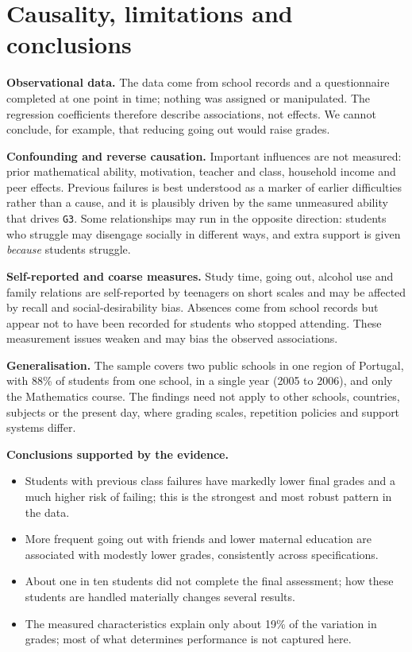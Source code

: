 \documentclass[11pt,a4paper]{article}
\begin{document}
\section{Causality, limitations and conclusions}

\textbf{Observational data.} The data come from school records and a questionnaire completed at one point in time; nothing was assigned or manipulated. The regression coefficients therefore describe associations, not effects. We cannot conclude, for example, that reducing going out would raise grades.

\textbf{Confounding and reverse causation.} Important influences are not measured: prior mathematical ability, motivation, teacher and class, household income and peer effects. Previous failures is best understood as a marker of earlier difficulties rather than a cause, and it is plausibly driven by the same unmeasured ability that drives \texttt{G3}. Some relationships may run in the opposite direction: students who struggle may disengage socially in different ways, and extra support is given \emph{because} students struggle.

\textbf{Self-reported and coarse measures.} Study time, going out, alcohol use and family relations are self-reported by teenagers on short scales and may be affected by recall and social-desirability bias. Absences come from school records but appear not to have been recorded for students who stopped attending. These measurement issues weaken and may bias the observed associations.

\textbf{Generalisation.} The sample covers two public schools in one region of Portugal, with 88\% of students from one school, in a single year (2005 to 2006), and only the Mathematics course. The findings need not apply to other schools, countries, subjects or the present day, where grading scales, repetition policies and support systems differ.

\textbf{Conclusions supported by the evidence.}
\begin{itemize}
\item Students with previous class failures have markedly lower final grades and a much higher risk of failing; this is the strongest and most robust pattern in the data.
\item More frequent going out with friends and lower maternal education are associated with modestly lower grades, consistently across specifications.
\item About one in ten students did not complete the final assessment; how these students are handled materially changes several results.
\item The measured characteristics explain only about 19\% of the variation in grades; most of what determines performance is not captured here.
\end{itemize}
\end{document}
